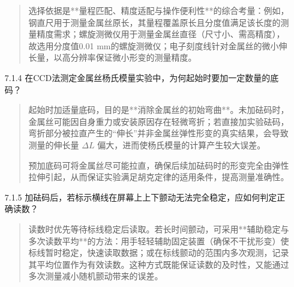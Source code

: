 \documentclass[11pt]{article}
\begin{document}
\begin{enumerate}
\begin{quote}
    选择依据是**量程匹配、精度适配与操作便利性**的综合考量：例如，钢直尺用于测量金属丝原长，其量程覆盖原长且分度值满足该长度的测量精度需求；螺旋测微仪用于测量金属丝直径（尺寸小、需高精度），故选用分度值0.01 mm的螺旋测微仪；电子刻度线针对金属丝的微小伸长量，以高分辨率保证微小形变的测量精度。
    \end{quote}

    \item[7.1.4] 在CCD法测定金属丝杨氏模量实验中，为何起始时要加一定数量的底码？
    \begin{quote}
    起始时加适量底码，目的是**消除金属丝的初始弯曲**。未加砝码时，金属丝可能因自身重力或安装原因存在轻微弯折；若直接加实验砝码，弯折部分被拉直产生的“伸长”并非金属丝弹性形变的真实结果，会导致测量的伸长量 \( \Delta L \) 偏大，进而使杨氏模量的计算产生较大误差。

    预加底码可将金属丝尽可能拉直，确保后续加砝码时的形变完全由弹性拉伸引起，从而保证实验满足胡克定律的适用条件，提高测量准确性。
    \end{quote}

    \item[7.1.5] 加砝码后，若标示横线在屏幕上上下颤动无法完全稳定，应如何判定正确读数？
    \begin{quote}
    读数时优先等待标线稳定后读取。若长时间颤动，可采用**辅助稳定与多次读数平均**的方法：用手轻轻辅助固定装置（确保不干扰形变）使标线暂时稳定，快速读取数据；或在标线颤动的范围内多次观测，记录其平均位置作为有效读数。这种方式既能保证读数的及时性，又能通过多次测量减小随机颤动带来的误差。
    \end{quote}
\end{enumerate}
\end{document}
